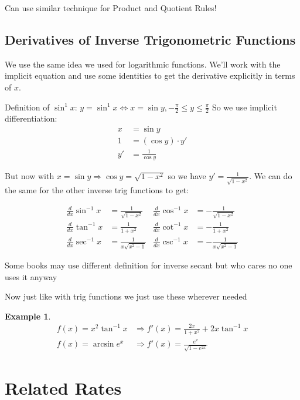 \documentclass[letterpaper, 11pt, openany]{book}
\theoremstyle{mytheoremstyle}
\theoremstyle{myexamplestyle}
\newtheorem{example}{Example}[section]
\begin{document}
Can use similar technique for Product and Quotient Rules!

\subsection{Derivatives of Inverse Trigonometric Functions}

We use the same idea we used for logarithmic functions. We'll work with the implicit equation and use some identities to get the derivative explicitly in terms of \(x\).

Definition of \(\sin^{1} x\): \(y = \sin^{1} x \Leftrightarrow x = \sin y, -\frac{\pi}{2} \leq y \leq \frac{\pi}{2} \)
So we use implicit differentiation:
\begin{align*}
    x &= \sin y\\
    1 &= (\cos y)\cdot y'\\
    y' &= \frac{1}{\cos y} 
\end{align*}

But now with \(x = \sin y \Rightarrow \cos y = \sqrt{1-x^{2}}\) so we have \(y' = \frac{1}{\sqrt{1 - x^{2}}}\). We can do the same for the other inverse trig functions to get:

\begin{align*}\label{inv-trig-deriv}
    \frac{d}{dx} \sin^{-1} x &= \frac{1}{\sqrt{1 - x^{2}}} & \frac{d}{dx} \cos^{-1} x &= -\frac{1}{\sqrt{1 - x^{2}}}\\
    \frac{d}{dx} \tan^{-1} x &= \frac{1}{1 + x^{2}} & \frac{d}{dx} \cot^{-1} x &= -\frac{1}{1 + x^{2}}\\
    \frac{d}{dx} \sec^{-1} x &= \frac{1}{x\sqrt{x^{2}-1}} & \frac{d}{dx} \csc^{-1} x &= -\frac{1}{x\sqrt{x^{2}-1}}
\end{align*}

Some books may use different definition for inverse secant but who cares no one uses it anyway \faLaugh

Now just like with trig functions we just use these wherever needed

\begin{example}\label{e:inv-trig-deriv}
    \begin{align*}
        f(x) = x^{2} \tan^{-1} x &\Rightarrow f'(x) = \frac{2x}{1 + x^{2}} + 2x \tan^{-1} x\\
        f(x) = \arcsin e^{x} &\Rightarrow f'(x) = \frac{e^{x}}{\sqrt{1 - e^{2x}}}
    \end{align*}
\end{example}

\section{Related Rates}
\end{document}
